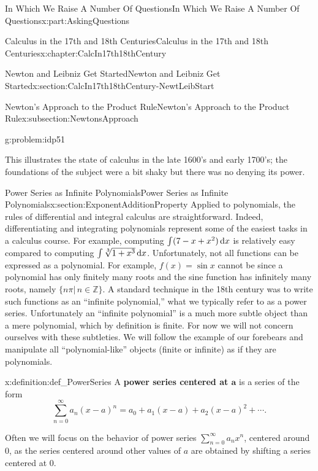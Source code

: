 \documentclass[oneside,10pt,]{book}
\newcommand{\terminology}[1]{\textbf{#1}}
\numberwithin{equation}{section}
\newcommand{\dx}[1]{\,{\rm d}#1}
\newcommand{\ZZ}{\mathbb {Z}}
\begin{document}
\begin{partptx}{In Which We Raise A Number Of Questions}{}{In Which We Raise A Number Of Questions}{}{}{x:part:AskingQuestions}
\begin{chapterptx}{Calculus in the 17th and 18th Centuries}{}{Calculus in the 17th and 18th Centuries}{}{}{x:chapter:CalcIn17th18thCentury}
\begin{sectionptx}{Newton and Leibniz Get Started}{}{Newton and Leibniz Get Started}{}{}{x:section:CalcIn17th18thCentury-NewtLeibStart}
\begin{subsectionptx}{Newton's Approach to the Product Rule}{}{Newton's Approach to the Product Rule}{}{}{x:subsection:NewtonsApproach}
\begin{problem}{}{g:problem:idp51}
\end{problem}
This illustrates the state of calculus in the late 1600's and early 1700's; the foundations of the subject were a bit shaky but there was no denying its power.%
\end{subsectionptx}
\end{sectionptx}
%
%
\typeout{************************************************}
\typeout{************************************************}
%
\begin{sectionptx}{Power Series as Infinite Polynomials}{}{Power Series as Infinite Polynomials}{}{}{x:section:ExponentAdditionProperty}
 Applied to polynomials, the rules of differential and integral calculus are straightforward.  Indeed, differentiating and integrating polynomials represent some of the easiest tasks in a calculus course.  For example, computing \(\int(7-x+x^2)\dx{ x}\) is relatively easy compared to computing \(\int\sqrt[3]{1+x^3}\dx{ x}\).  Unfortunately, not all functions can be expressed as a polynomial.  For example, \(f(x)=\sin x\) cannot be since a polynomial has only finitely many roots and the sine function has infinitely many roots, namely \(\{n\pi|\,n\in\ZZ\}\).  A standard technique in the 18th century was to write such functions as an ``infinite polynomial,'' what we typically refer to as a power series.  Unfortunately an ``infinite polynomial'' is a much more subtle object than a mere polynomial, which by definition is finite. For now we will not concern ourselves with these subtleties.  We will follow the example of our forebears and manipulate all ``polynomial-like'' objects (finite or infinite) as if they are polynomials.%
\begin{definition}{}{x:definition:def_PowerSeries}%
 A \terminology{power series centered at \(\boldsymbol{a}\)} is a series of the form%
\begin{equation*}
\sum_{n=0}^\infty a_n(x-a)^n=a_0+a_1(x-a)+a_2(x-a)^2+\cdots\text{.}
\end{equation*}
%
\par
Often we will focus on the behavior of power series \(\sum_{n=0}^\infty a_nx^n\), centered around \(0\), as the series centered around other values of \(a\) are obtained by shifting a series centered at \(0\).%
\end{definition}

\end{sectionptx}
\end{chapterptx}
\end{partptx}
\end{document}
